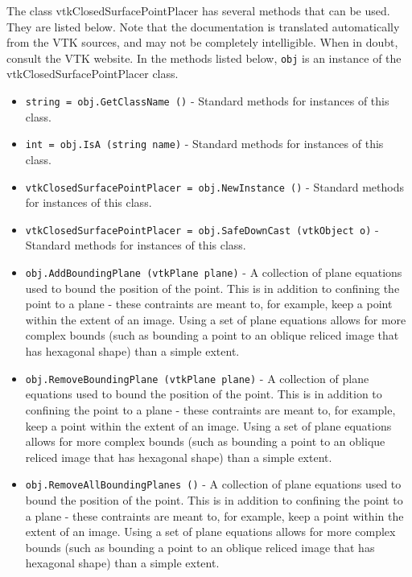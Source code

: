 The class vtkClosedSurfacePointPlacer has several methods that can be used.
  They are listed below.
Note that the documentation is translated automatically from the VTK sources,
and may not be completely intelligible.  When in doubt, consult the VTK website.
In the methods listed below, \verb|obj| is an instance of the vtkClosedSurfacePointPlacer class.
\begin{itemize}
\item  \verb|string = obj.GetClassName ()| -  Standard methods for instances of this class.

\item  \verb|int = obj.IsA (string name)| -  Standard methods for instances of this class.

\item  \verb|vtkClosedSurfacePointPlacer = obj.NewInstance ()| -  Standard methods for instances of this class.

\item  \verb|vtkClosedSurfacePointPlacer = obj.SafeDownCast (vtkObject o)| -  Standard methods for instances of this class.

\item  \verb|obj.AddBoundingPlane (vtkPlane plane)| -  A collection of plane equations used to bound the position of the point.
 This is in addition to confining the point to a plane - these contraints
 are meant to, for example, keep a point within the extent of an image.
 Using a set of plane equations allows for more complex bounds (such as
 bounding a point to an oblique reliced image that has hexagonal shape)
 than a simple extent.

\item  \verb|obj.RemoveBoundingPlane (vtkPlane plane)| -  A collection of plane equations used to bound the position of the point.
 This is in addition to confining the point to a plane - these contraints
 are meant to, for example, keep a point within the extent of an image.
 Using a set of plane equations allows for more complex bounds (such as
 bounding a point to an oblique reliced image that has hexagonal shape)
 than a simple extent.

\item  \verb|obj.RemoveAllBoundingPlanes ()| -  A collection of plane equations used to bound the position of the point.
 This is in addition to confining the point to a plane - these contraints
 are meant to, for example, keep a point within the extent of an image.
 Using a set of plane equations allows for more complex bounds (such as
 bounding a point to an oblique reliced image that has hexagonal shape)
 than a simple extent.


\end{itemize}
